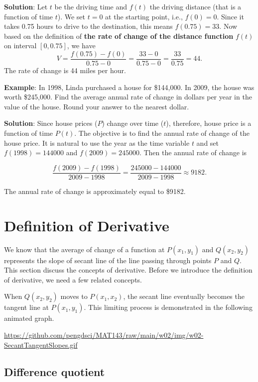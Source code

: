 \documentclass[
]{book}
\begin{document}
\textbf{Solution}: Let \(t\) be the driving time and \(f(t)\) the driving distance (that is a function of time \(t\)). We set \(t=0\) at the starting point, i.e., \(f(0)=0\). Since it takes 0.75 hours to drive to the destination, this means \(f(0.75) = 33\). Now based on the definition of \textbf{the rate of change of the distance function} \(f(t)\) on interval \([0, 0.75]\), we have \[
V = \frac{f(0.75) - f(0)}{0.75-0} = \frac{33-0}{0.75-0} = \frac{33}{0.75} = 44.
\] The rate of change is 44 miles per hour.

\textbf{Example}: In 1998, Linda purchased a house for \$144,000. In 2009, the house was worth \$245,000. Find the average annual rate of change in dollars per year in the value of the house. Round your answer to the nearest dollar.

\textbf{Solution}: Since house prices (\(P\)) change over time (\(t\)), therefore, house price is a function of time \(P(t)\). The objective is to find the annual rate of change of the house price. It is natural to use the year as the time variable \(t\) and set \(f(1998) = 144000\) and \(f(2009) = 245000\). Then the annual rate of change is

\[
\frac{f(2009) - f(1998)}{2009 - 1998} = \frac{245000-144000}{2009-1998} \approx 9182.
\]

The annual rate of change is approximately equal to \$9182.

\hfill\break

\hypertarget{definition-of-derivative}{%
\section{Definition of Derivative}\label{definition-of-derivative}}

We know that the average of change of a function at \(P(x_1, y_1)\) and \(Q(x_2, y_2)\) represents the slope of secant line of the line passing through points \(P\) and \(Q\). This section discuss the concepts of derivative. Before we introduce the definition of derivative, we need a few related concepts.

When \(Q(x_2, y_2)\) moves to \(P(x_1, x_2)\), the secant line eventually becomes the tangent line at \(P(x_1, y_1)\). This limiting process is demonstrated in the following animated graph.

\hfill\break

\url{https://github.com/pengdsci/MAT143/raw/main/w02/img/w02-SecantTangentSlopes.gif}

\hypertarget{difference-quotient-2}{%
\subsection{Difference quotient}\label{difference-quotient-2}}
\end{document}
